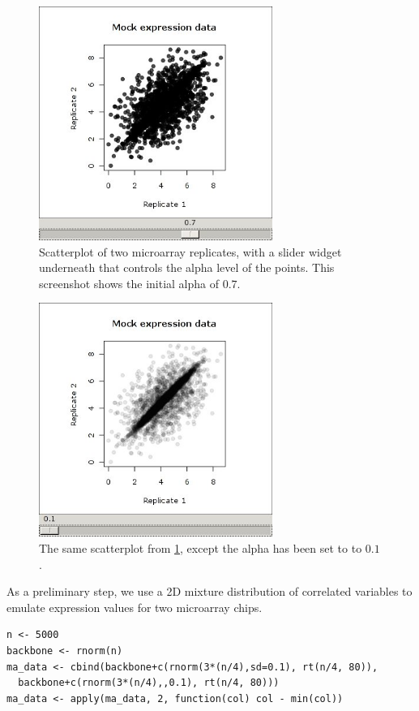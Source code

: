 \documentclass[article]{jss}
\begin{document}
\begin{figure}
\begin{center}
\includegraphics[width=3in]{demo-alpha-random-07-3}
\caption{\label{fig:rgtk2-demo-initial}Scatterplot of two microarray replicates,
with a slider widget underneath that controls the alpha level of the
points. This screenshot shows the initial alpha of $0.7$.}
\end{center}
\end{figure}

\begin{figure}
\begin{center}
\includegraphics[width=3in]{demo-alpha-random-01-3}
\caption{\label{fig:rgtk2-demo-final}The same scatterplot from 
\ref{fig:rgtk2-demo-initial}, except the alpha has been set to to $0.1$.}
\end{center}
\end{figure}

As a preliminary step, we use a 2D mixture distribution of correlated variables
to emulate expression values for two microarray chips. 
\begin{verbatim}
n <- 5000
backbone <- rnorm(n)
ma_data <- cbind(backbone+c(rnorm(3*(n/4),sd=0.1), rt(n/4, 80)), 
  backbone+c(rnorm(3*(n/4),,0.1), rt(n/4, 80)))
ma_data <- apply(ma_data, 2, function(col) col - min(col))
\end{verbatim}
\end{document}
